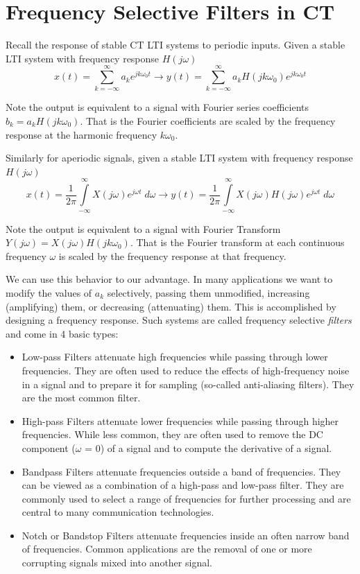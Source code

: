 \section{Frequency Selective Filters in CT}

Recall the response of stable CT LTI systems to periodic inputs. Given a stable LTI system with frequency response $H(j\omega)$
\[       
x(t) = \sum\limits_{k = -\infty}^{\infty} a_k e^{jk\omega_0 t} \longrightarrow y(t) = \sum\limits_{k = -\infty}^{\infty} a_k H(jk\omega_0) e^{jk\omega_0 t} 
\]

Note the output is equivalent to a signal with Fourier series coefficients $b_k = a_k H(jk\omega_0)$. That is the Fourier coefficients are scaled by the frequency response at the harmonic frequency $k\omega_0$.

Similarly for aperiodic signals, given a stable LTI system with frequency response $H(j\omega)$
\[       
x(t) = \frac{1}{2\pi} \int\limits_{-\infty}^{\infty} X(j\omega) e^{j\omega t}\; d\omega \longrightarrow y(t) = \frac{1}{2\pi} \int\limits_{-\infty}^{\infty} X(j\omega) H(j\omega) e^{j\omega t}\; d\omega 
\]

Note the output is equivalent to a signal with Fourier Transform $Y(j\omega) = X(j\omega) H(jk\omega_0)$. That is the Fourier transform at each continuous frequency $\omega$ is scaled by the frequency response at that frequency.

We can use this behavior to our advantage. In many applications we want to modify the values of $a_k$ selectively, passing them unmodified, increasing (amplifying) them, or decreasing (attenuating) them. This is accomplished by designing a frequency response. Such systems are called frequency selective \emph{filters} and come in 4 basic types:
\begin{itemize}
\item Low-pass Filters attenuate high frequencies while passing through lower frequencies. They are often used to reduce the effects of high-frequency noise in a signal and to prepare it for sampling (so-called anti-aliasing filters). They are the most common filter.
\item High-pass Filters attenuate lower frequencies while passing through higher frequencies. While less common, they are often used to remove the DC component ($\omega$ = 0) of a signal and to compute the derivative of a signal.
\item Bandpass Filters attenuate frequencies outside a band of frequencies. They can be viewed as a combination of a high-pass and low-pass filter. They are commonly used to select a range of frequencies for further processing and are central to many communication technologies.
\item Notch or Bandstop Filters attenuate frequencies inside an often narrow band of frequencies. Common applications are the removal of one or more corrupting signals mixed into another signal.
\end{itemize}

